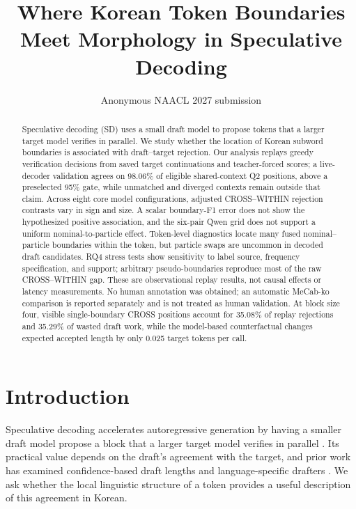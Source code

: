 \documentclass[11pt]{article}
\title{Where Korean Token Boundaries Meet Morphology in Speculative Decoding}
\author{Anonymous NAACL 2027 submission}
\begin{document}
\maketitle

\begin{abstract}
Speculative decoding (SD) uses a small draft model to propose tokens that a
larger target model verifies in parallel. We study whether the location of
Korean subword boundaries is associated with draft--target rejection. Our
analysis replays greedy verification decisions from saved target continuations
and teacher-forced scores; a live-decoder validation agrees on 98.06\% of
eligible shared-context Q2 positions, above a preselected 95\% gate, while
unmatched and diverged contexts remain outside that claim. Across eight core
model configurations, adjusted CROSS--WITHIN rejection contrasts vary in sign
and size. A scalar boundary-F1 error does not show the hypothesized positive
association, and the six-pair Qwen grid does not support a uniform
nominal-to-particle effect. Token-level diagnostics locate many fused
nominal--particle boundaries within the token, but particle swaps are uncommon
in decoded draft candidates. RQ4 stress tests show sensitivity to label source,
frequency specification, and support; arbitrary pseudo-boundaries reproduce
most of the raw CROSS--WITHIN gap. These are observational replay results, not
causal effects or latency measurements. No human annotation was obtained; an
automatic MeCab-ko comparison is reported separately and is not treated as
human validation. At block size four, visible single-boundary CROSS positions
account for 35.08\% of replay rejections and 35.29\% of wasted draft work,
while the model-based counterfactual changes expected accepted length by only
0.025 target tokens per call.
\end{abstract}

\section{Introduction}
\label{sec:intro}

Speculative decoding accelerates autoregressive generation by having a smaller
draft model propose a block that a larger target model verifies in parallel
\citep{leviathan2023,chen2023speculative}. Its practical value depends on the
draft's agreement with the target, and prior work has examined confidence-based
draft lengths and language-specific drafters \citep{zhang2025draft,yi2024multilingual}.
We ask whether the local linguistic structure of a token provides a useful
description of this agreement in Korean.
\end{document}
